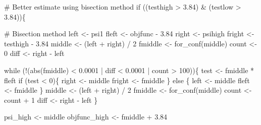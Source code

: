\documentclass[
  10pt,
  a4paper,
]{book}
\newenvironment{Shaded}{\begin{snugshade}}{\end{snugshade}}
\newcommand{\CommentTok}[1]{\textcolor[rgb]{0.37,0.37,0.37}{#1}}
\newcommand{\ControlFlowTok}[1]{\textcolor[rgb]{0.00,0.46,0.62}{#1}}
\newcommand{\DecValTok}[1]{\textcolor[rgb]{0.68,0.00,0.00}{#1}}
\newcommand{\FloatTok}[1]{\textcolor[rgb]{0.68,0.00,0.00}{#1}}
\newcommand{\FunctionTok}[1]{\textcolor[rgb]{0.28,0.35,0.67}{#1}}
\newcommand{\NormalTok}[1]{\textcolor[rgb]{0.00,0.46,0.62}{#1}}
\newcommand{\OtherTok}[1]{\textcolor[rgb]{0.00,0.46,0.62}{#1}}
\newcommand{\SpecialCharTok}[1]{\textcolor[rgb]{0.37,0.37,0.37}{#1}}
\begin{document}
\begin{Shaded}
\begin{Highlighting}[]
  \CommentTok{\# Better estimate using bisection method}
  \ControlFlowTok{if}\NormalTok{ ((testhigh }\SpecialCharTok{\textgreater{}} \FloatTok{3.84}\NormalTok{) }\SpecialCharTok{\&}\NormalTok{ (testlow }\SpecialCharTok{\textgreater{}} \FloatTok{3.84}\NormalTok{))\{}
    
    \CommentTok{\# Bisection method}
\NormalTok{    left }\OtherTok{\textless{}{-}}\NormalTok{ psi1}
\NormalTok{    fleft }\OtherTok{\textless{}{-}}\NormalTok{ objfunc }\SpecialCharTok{{-}} \FloatTok{3.84}
\NormalTok{    right }\OtherTok{\textless{}{-}}\NormalTok{ psihigh}
\NormalTok{    fright }\OtherTok{\textless{}{-}}\NormalTok{ testhigh }\SpecialCharTok{{-}} \FloatTok{3.84}
\NormalTok{    middle }\OtherTok{\textless{}{-}}\NormalTok{ (left  }\SpecialCharTok{+}\NormalTok{ right) }\SpecialCharTok{/} \DecValTok{2}
\NormalTok{    fmiddle }\OtherTok{\textless{}{-}} \FunctionTok{for\_conf}\NormalTok{(middle)}
\NormalTok{    count }\OtherTok{\textless{}{-}} \DecValTok{0}
\NormalTok{    diff }\OtherTok{\textless{}{-}}\NormalTok{ right }\SpecialCharTok{{-}}\NormalTok{ left}
    
    \ControlFlowTok{while}\NormalTok{ (}\SpecialCharTok{!}\NormalTok{(}\FunctionTok{abs}\NormalTok{(fmiddle) }\SpecialCharTok{\textless{}} \FloatTok{0.0001} \SpecialCharTok{|}\NormalTok{ diff }\SpecialCharTok{\textless{}} \FloatTok{0.0001} \SpecialCharTok{|}\NormalTok{ count }\SpecialCharTok{\textgreater{}} \DecValTok{100}\NormalTok{))\{}
\NormalTok{      test }\OtherTok{\textless{}{-}}\NormalTok{ fmiddle }\SpecialCharTok{*}\NormalTok{ fleft}
      \ControlFlowTok{if}\NormalTok{ (test }\SpecialCharTok{\textless{}} \DecValTok{0}\NormalTok{)\{}
\NormalTok{        right }\OtherTok{\textless{}{-}}\NormalTok{ middle}
\NormalTok{        fright }\OtherTok{\textless{}{-}}\NormalTok{ fmiddle}
\NormalTok{      \} }\ControlFlowTok{else}\NormalTok{ \{}
\NormalTok{        left }\OtherTok{\textless{}{-}}\NormalTok{ middle}
\NormalTok{        fleft }\OtherTok{\textless{}{-}}\NormalTok{ fmiddle}
\NormalTok{      \}}
\NormalTok{      middle }\OtherTok{\textless{}{-}}\NormalTok{ (left }\SpecialCharTok{+}\NormalTok{ right) }\SpecialCharTok{/} \DecValTok{2}
\NormalTok{      fmiddle }\OtherTok{\textless{}{-}} \FunctionTok{for\_conf}\NormalTok{(middle)}
\NormalTok{      count }\OtherTok{\textless{}{-}}\NormalTok{ count }\SpecialCharTok{+} \DecValTok{1}
\NormalTok{      diff }\OtherTok{\textless{}{-}}\NormalTok{ right }\SpecialCharTok{{-}}\NormalTok{ left}
\NormalTok{    \}}
    
\NormalTok{    psi\_high }\OtherTok{\textless{}{-}}\NormalTok{ middle}
\NormalTok{    objfunc\_high }\OtherTok{\textless{}{-}}\NormalTok{ fmiddle }\SpecialCharTok{+} \FloatTok{3.84}
    

\end{Highlighting}
\end{Shaded}
\end{document}
